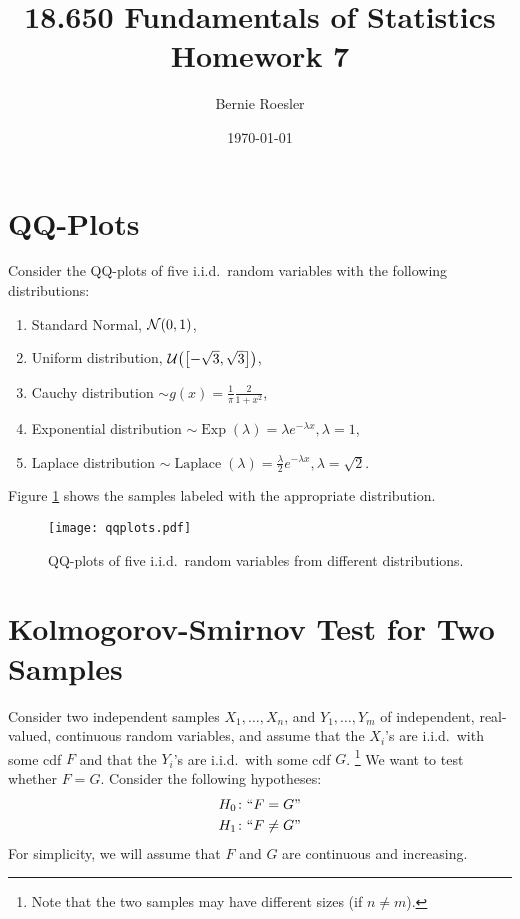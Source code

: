 \documentclass[letterpaper, reqno]{amsart}
\title[Homework 7 -- Problem \thesection]{18.650 Fundamentals of Statistics\\{\large Homework 7}}
\author{Bernie Roesler}
\date{\today}
\numberwithin{equation}{section}
\newcommand{\N}[2]{\mathcal{N}\mleft( #1, #2 \mright)}
\newcommand{\U}[2]{\mathcal{U}\mleft(\mleft[ #1, #2 \mright]\mright)}
\newcommand{\iid}{i.i.d.}
\begin{document}

\graphicspath{{./figures/}}

\maketitle

\section{QQ-Plots}
Consider the QQ-plots of five \iid\ random variables with the following
distributions:
\begin{enumerate}
\item Standard Normal, $\N{0}{1}$,
  \item Uniform distribution, $\U{-\sqrt{3}}{\sqrt{3}}$,
  \item Cauchy distribution $\sim g(x) = \frac{1}{\pi}\frac{2}{1+x^2}$,
  \item Exponential distribution $\sim \operatorname{Exp}(\lambda) = \lambda
    e^{-\lambda x}, \lambda = 1$,
  \item Laplace distribution $\sim \operatorname{Laplace}(\lambda)
    = \frac{\lambda}{2} e^{-\lambda x}, \lambda = \sqrt{2}$.
\end{enumerate}
Figure \ref{fig:qqplots} shows the samples labeled with the appropriate
distribution.

\begin{figure}[!h]
  \centering
  \texttt{[image: qqplots.pdf]}
  \caption{QQ-plots of five \iid\ random variables from different distributions.}
  \label{fig:qqplots}
\end{figure}

\clearpage
\section{Kolmogorov-Smirnov Test for Two Samples}
Consider two independent samples $X_1, \dots, X_n$, and $Y_1, \dots, Y_m$ of
independent, real-valued, continuous random variables, and assume that the $X_i$'s
are \iid\ with some cdf $F$ and that the $Y_i$'s are \iid\ with some cdf $G$. 
\footnote{Note that the two samples may have different sizes (if $n \ne m$).}
We want to test whether $F = G$.
Consider the following hypotheses:
\begin{align*}
  H_0 \colon ``F = G" \\
  H_1 \colon ``F \ne G"
\end{align*}
For simplicity, we will assume that $F$ and $G$ are continuous and increasing.
\end{document}
